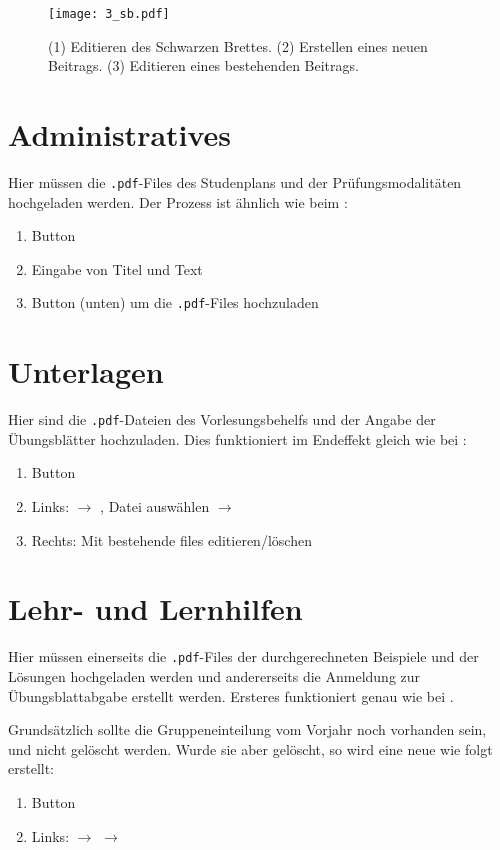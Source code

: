 \begin{figure}[htbp]
  \texttt{[image: 3\_sb.pdf]}
  \caption{ (1) Editieren des Schwarzen Brettes. (2) Erstellen eines neuen
    Beitrags. (3) Editieren eines bestehenden Beitrags.}
  \label{fig:sb}
\end{figure}

\section{Administratives}

Hier müssen die {\tt .pdf}-Files des Studenplans und der Prüfungsmodalitäten
hochgeladen werden. Der Prozess ist ähnlich wie beim :
\begin{enumerate}
\item Button 
\item Eingabe von Titel und Text
\item Button  (unten) um die {\tt .pdf}-Files hochzuladen
\end{enumerate}


\section{Unterlagen}

Hier sind die {\tt .pdf}-Dateien des Vorlesungsbehelfs und der Angabe der
Übungsblätter hochzuladen. Dies funktioniert im Endeffekt gleich wie bei
:
\begin{enumerate}
\item Button 
\item Links:  $\to$ , Datei auswählen
  $\to$ 
\item Rechts: Mit  bestehende files editieren/löschen
\end{enumerate}


\section{Lehr- und Lernhilfen}

Hier müssen einerseits die {\tt .pdf}-Files der durchgerechneten Beispiele und
der Lösungen hochgeladen werden und andererseits die Anmeldung zur 
Übungsblattabgabe erstellt werden. Ersteres funktioniert genau wie bei
.

Grundsätzlich sollte die Gruppeneinteilung vom Vorjahr noch vorhanden sein, und
nicht gelöscht werden. Wurde sie aber gelöscht, so wird eine neue wie folgt
erstellt:
\begin{enumerate}
\item Button 
\item Links:  $\to$ 
  $\to$ 
\end{enumerate}

